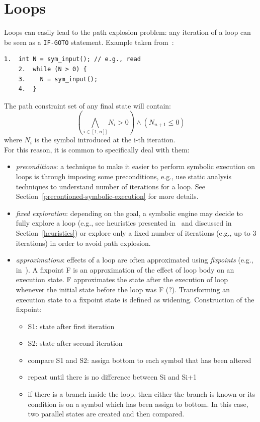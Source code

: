 \section{Loops}

Loops can easily lead to the path explosion problem: any iteration of a loop can be seen as a {\tt IF-GOTO} statement. Example taken from~\cite{CS-CACM13}:
    \begin{lstlisting}[basicstyle=\ttfamily\small]
    1.  int N = sym_input(); // e.g., read
    2.  while (N > 0) {
    3.    N = sym_input();  
    4.  }
    \end{lstlisting}
The path constraint set of any final state will contain:
  \[ \left ( \bigwedge_{i \in [1, n]]} N_i > 0 \right ) \wedge (N_{n+1} \leq 0) \]
where $N_i$ is the symbol introduced at the i-th iteration.\\

For this reason, it is common to specifically deal with them:
\begin{itemize}

  \item {\em preconditions}: a technique to make it easier to perform symbolic execution on loops is through imposing some preconditions, e.g., use static analysis techniques to understand number of iterations for a loop. See Section~\ref{precontioned-symbolic-execution} for more details.

  \item {\em fixed exploration}: depending on the goal, a symbolic engine may decide to fully explore a loop (e.g., see heuristics presented in~\cite{AEG-NDSS11} and discussed in Section~\ref{heuristics}) or explore only a fixed number of iterations (e.g., up to 3 iterations) in order to avoid path explosion.

  \item {\em approximations}: effects of a loop are often approximated using {\em fixpoints} (e.g., in~\cite{KKM-USEC05,BNS-SP06,CFB-ACSAC06}). A fixpoint F is an approximation of the effect of loop body on an execution state. F approximates the state after the execution of loop whenever the initial state before the loop was F (?). Transforming an execution state to a fixpoint state is defined as widening. Construction of the fixpoint:
  \begin{itemize}
    \item S1: state after first iteration
    \item S2: state after second iteration
    \item compare S1 and S2: assign bottom to each symbol that has been altered
    \item repeat until there is no difference between Si and Si+1
    \item if there is a branch inside the loop, then either the branch is known or its condition is on a symbol which has been assign to bottom. In this case, two parallel states are created and then compared.
  \end{itemize}

\end{itemize}


